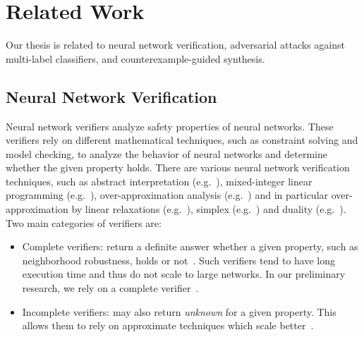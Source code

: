 
\section{Related Work}
Our thesis is related to neural network verification, adversarial attacks against multi-label classifiers, and counterexample-guided synthesis.

\subsection{Neural Network Verification}\label{subsec:verifiers}
Neural network verifiers analyze safety properties of neural networks.
These verifiers rely on different mathematical techniques, such as constraint solving and model checking, to analyze the behavior of neural networks and determine whether the given property holds.
There are various neural network verification techniques, such as abstract interpretation (e.g.~\cite{ABSTRACTINTER, INCOMPLETE1}), mixed-integer linear programming (e.g.~\cite{MIPVERIFY, singh2018robustness, lazarus2022mixed}), over-approximation analysis (e.g.~\cite{qin2019verification, overapprox, NEURIPS2018_2ecd2bd9}) and in particular over-approximation by linear relaxations (e.g.~\cite{NEURIPS2021_fac7fead, Boopathy_Weng_Chen_Liu_Daniel_2019, 8418593, NEURIPS2019_0a9fdbb1, NEURIPS2019_246a3c55, linearOverapprox, MLSYS2021_ca46c1b9}), simplex (e.g.~\cite{Reluplex, Marabou, simplex-based}) and duality (e.g.~\cite{raghunathan2020certified, dvijotham2018dual}).
Two main categories of verifiers are:
\begin{itemize}
    \item Complete verifiers: return a definite answer whether a given property, such as neighborhood robustness, holds or not~\cite{MIPVERIFY, COMPLETE}.
    Such verifiers tend to have long execution time and thus do not scale to large networks.
        In our preliminary research, we rely on a complete verifier~\cite{MIPVERIFY}.
    \item Incomplete verifiers: may also return \emph{unknown} for a given property.
    This allows them to rely on approximate techniques which scale better~\cite{INCOMPLETE1, INCOMPLETE2}.
\end{itemize}

